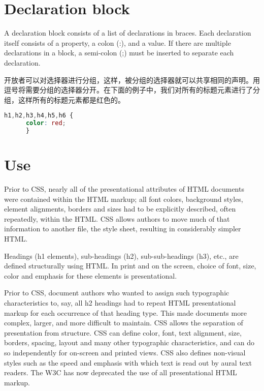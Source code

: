 \section{Declaration block}

A declaration block consists of a list of declarations in braces. Each declaration itself consists of a property, a colon (:), and a value. If there are multiple declarations in a block, a semi-colon (;) must be inserted to separate each declaration.


开放者可以对选择器进行分组，这样，被分组的选择器就可以共享相同的声明。用逗号将需要分组的选择器分开。在下面的例子中，我们对所有的标题元素进行了分组，这样所有的标题元素都是红色的。

\begin{lstlisting}[language=CSS]
h1,h2,h3,h4,h5,h6 {
      color: red;
      }
\end{lstlisting}





\section{Use}


Prior to CSS, nearly all of the presentational attributes of HTML documents were contained within the HTML markup; all font colors, background styles, element alignments, borders and sizes had to be explicitly described, often repeatedly, within the HTML. CSS allows authors to move much of that information to another file, the style sheet, resulting in considerably simpler HTML.


Headings (h1 elements), sub-headings (h2), sub-sub-headings (h3), etc., are defined structurally using HTML. In print and on the screen, choice of font, size, color and emphasis for these elements is presentational.

Prior to CSS, document authors who wanted to assign such typographic characteristics to, say, all h2 headings had to repeat HTML presentational markup for each occurrence of that heading type. This made documents more complex, larger, and more difficult to maintain. CSS allows the separation of presentation from structure. CSS can define color, font, text alignment, size, borders, spacing, layout and many other typographic characteristics, and can do so independently for on-screen and printed views. CSS also defines non-visual styles such as the speed and emphasis with which text is read out by aural text readers. The W3C has now deprecated the use of all presentational HTML markup.


